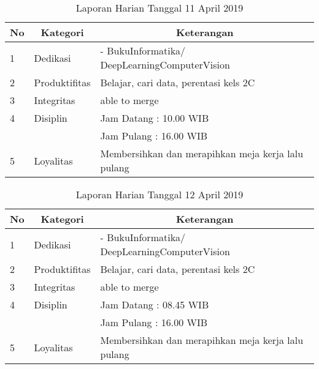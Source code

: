 \begin{table}[htp]
\caption{Laporan Harian Tanggal 11 April 2019}
\label{tab:lh110419}
\begin{tabular}{|l|l|l|}
\hline
\textbf{No} & \multicolumn{1}{c|}{\textbf{Kategori}} & \multicolumn{1}{c|}{\textbf{Keterangan}} \\ \hline
1 & Dedikasi & - BukuInformatika/ DeepLearningComputerVision \\ \hline
2 & Produktifitas & Belajar, cari data, perentasi kels 2C  \\
3 & Integritas & able to merge \\ \hline
4 & Disiplin & Jam Datang : 10.00 WIB \\
 &  & Jam Pulang : 16.00 WIB \\ \hline
5 & Loyalitas & Membersihkan dan merapihkan meja kerja lalu pulang  \\ \hline
\end{tabular}
\end{table}

\begin{table}[htp]
\caption{Laporan Harian Tanggal 12 April 2019}
\label{tab:lh120419}
\begin{tabular}{|l|l|l|}
\hline
\textbf{No} & \multicolumn{1}{c|}{\textbf{Kategori}} & \multicolumn{1}{c|}{\textbf{Keterangan}} \\ \hline
1 & Dedikasi & - BukuInformatika/ DeepLearningComputerVision \\ \hline
2 & Produktifitas & Belajar, cari data, perentasi kels 2C  \\
3 & Integritas & able to merge \\ \hline
4 & Disiplin & Jam Datang : 08.45 WIB \\
 &  & Jam Pulang : 16.00 WIB \\ \hline
5 & Loyalitas & Membersihkan dan merapihkan meja kerja lalu pulang  \\ \hline
\end{tabular}
\end{table}